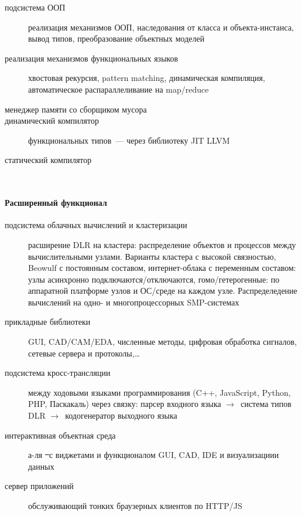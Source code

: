 \begin{description}
  \item[подсистема ООП] реализация механизмов ООП, наследования от класса и
  объекта-инстанса, вывод типов, преобразование объектных моделей
  \item[реализация механизмов функциональных языков] хвостовая рекурсия, pattern
  matching, динамическая компиляция, автоматическое распараллеливание на
  map/reduce
  \item[менеджер памяти со сборщиком мусора]
  \item[динамический компилятор] функциональных типов\ --- через библиотеку JIT
  LLVM
  \item[статический компилятор] \ \\
\end{description}

\paragraph{Расширенный функционал}

\begin{description}
  \item[подсистема облачных вычислений и кластеризации] расширение DLR на
  кластера: распределение объектов и процессов между вычислительными узлами.
  Варианты кластера с высокой связностью, Beowulf с
  постоянным составом, интернет-облака с переменным составом: узлы асинхронно
  подключаются/отключаются, гомо/гетерогенные: по аппаратной платформе узлов и
  ОС/среде на каждом узле. Распределедение вычислений на одно- и
  многопроцессорных SMP-системах
  \item[прикладные библиотеки] GUI, CAD/CAM/EDA, численные методы, цифровая
  обработка сигналов, сетевые сервера и протоколы,\ldots
  \item[подсистема кросс-трансляции] между ходовыми языками программирования
  (C++, JavaScript, Python, PHP, Паскакаль) через связку: парсер входного
  языка $\rightarrow$\ система типов DLR $\rightarrow$\ кодогенератор выходного
  языка
  \item[интерактивная объектная среда] а-ля \st\ с виджетами и функционалом GUI,
  CAD, IDE и визуализациии данных
  \item[сервер приложений] обслуживающий тонких браузерных клиентов по HTTP/JS
\end{description}


